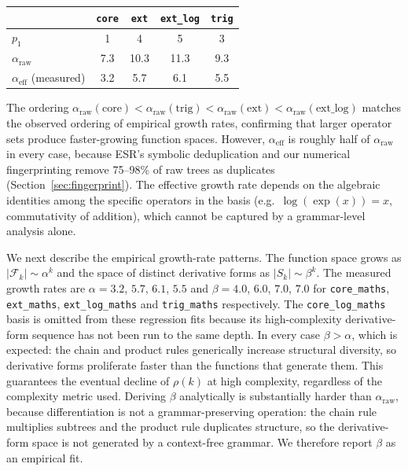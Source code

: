 \documentclass[preprint,12pt,authoryear]{elsarticle}
\newcommand{\rhok}{\rho(k)}
\newcommand{\hd}[1]{{\color{red}\textbf{[HD: #1]}}}
\begin{document}
\begin{center}
\begin{tabular}{lcccc}
\toprule
& \texttt{core} & \texttt{ext} & \texttt{ext\_log} & \texttt{trig} \\
\midrule
$p_1$ & 1 & 4 & 5 & 3 \\
$\alpha_{\mathrm{raw}}$ & 7.3 & 10.3 & 11.3 & 9.3 \\
$\alpha_{\mathrm{eff}}$ (measured) & 3.2 & 5.7 & 6.1 & 5.5 \\
\bottomrule
\end{tabular}
\end{center}

The ordering $\alpha_{\mathrm{raw}}(\mathrm{core}) < \alpha_{\mathrm{raw}}(\mathrm{trig}) < \alpha_{\mathrm{raw}}(\mathrm{ext}) < \alpha_{\mathrm{raw}}(\mathrm{ext\_log})$ matches the observed ordering of empirical growth rates, confirming that larger operator sets produce faster-growing function spaces. However, $\alpha_{\mathrm{eff}}$ is roughly half of $\alpha_{\mathrm{raw}}$ in every case, because ESR's symbolic deduplication and our numerical fingerprinting remove 75--98\% of raw trees as duplicates (Section~\ref{sec:fingerprint}). The effective growth rate depends on the algebraic identities among the specific operators in the basis (e.g.\ $\log(\exp(x)) = x$, commutativity of addition), which cannot be captured by a grammar-level analysis alone.

We next describe the empirical growth-rate patterns. The function space grows as $|\mathcal{F}_k| \sim \alpha^k$ and the space of distinct derivative forms as $|S_k| \sim \beta^k$. The measured growth rates are $\alpha = 3.2$, $5.7$, $6.1$, $5.5$ and $\beta = 4.0$, $6.0$, $7.0$, $7.0$ for \texttt{core\_maths}, \texttt{ext\_maths}, \texttt{ext\_log\_maths} and \texttt{trig\_maths} respectively. The \texttt{core\_log\_maths} basis is omitted from these regression fits because its high-complexity derivative-form sequence has not been run to the same depth. In every case $\beta > \alpha$, which is expected: the chain and product rules generically increase structural diversity, so derivative forms proliferate faster than the functions that generate them. This guarantees the eventual decline of $\rhok$ at high complexity, regardless of the complexity metric used. Deriving $\beta$ analytically is substantially harder than $\alpha_{\mathrm{raw}}$, because differentiation is not a grammar-preserving operation: the chain rule multiplies subtrees and the product rule duplicates structure, so the derivative-form space is not generated by a context-free grammar. We therefore report $\beta$ as an empirical fit.
\end{document}
